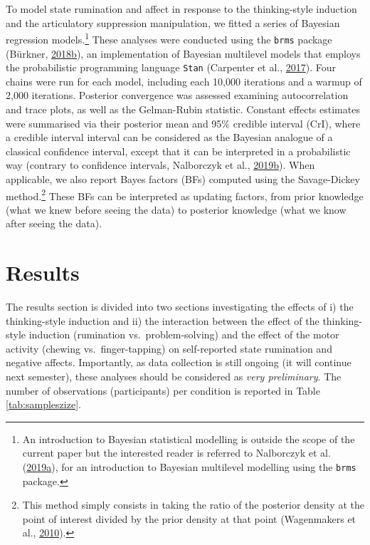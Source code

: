 \documentclass[a4paper,12pt,twoside,onecolumn,openright,final,oldfontcommands]{memoir}
\let\rmarkdownfootnote\footnote%
\def\footnote{\protect\rmarkdownfootnote}
\begin{document}
To model state rumination and affect in response to the thinking-style induction and the articulatory suppression manipulation, we fitted a series of Bayesian regression models.\footnote{An introduction to Bayesian statistical modelling is outside the scope of the current paper but the interested reader is referred to Nalborczyk et al. (\protect\hyperlink{ref-nalborczyk_introduction_2019}{2019}\protect\hyperlink{ref-nalborczyk_introduction_2019}{a}), for an introduction to Bayesian multilevel modelling using the \texttt{brms} package.} These analyses were conducted using the \texttt{brms} package (Bürkner, \protect\hyperlink{ref-R-brms}{2018}\protect\hyperlink{ref-R-brms}{b}), an implementation of Bayesian multilevel models that employs the probabilistic programming language \texttt{Stan} (Carpenter et al., \protect\hyperlink{ref-carpenter_stan_2017}{2017}). Four chains were run for each model, including each 10,000 iterations and a warmup of 2,000 iterations. Posterior convergence was assessed examining autocorrelation and trace plots, as well as the Gelman-Rubin statistic. Constant effects estimates were summarised via their posterior mean and 95\% credible interval (CrI), where a credible interval interval can be considered as the Bayesian analogue of a classical confidence interval, except that it can be interpreted in a probabilistic way (contrary to confidence intervals, Nalborczyk et al., \protect\hyperlink{ref-nalborczyk_pragmatism_2019}{2019}\protect\hyperlink{ref-nalborczyk_pragmatism_2019}{b}). When applicable, we also report Bayes factors (BFs) computed using the Savage-Dickey method.\footnote{This method simply consists in taking the ratio of the posterior density at the point of interest divided by the prior density at that point (Wagenmakers et al., \protect\hyperlink{ref-wagenmakers_bayesian_2010}{2010}).} These BFs can be interpreted as updating factors, from prior knowledge (what we knew before seeing the data) to posterior knowledge (what we know after seeing the data).

\hypertarget{results-4}{%
\section{Results}\label{results-4}}

The results section is divided into two sections investigating the effects of i) the thinking-style induction and ii) the interaction between the effect of the thinking-style induction (rumination vs.~problem-solving) and the effect of the motor activity (chewing vs.~finger-tapping) on self-reported state rumination and negative affects. Importantly, as data collection is still ongoing (it will continue next semester), these analyses should be considered as \emph{very preliminary}. The number of observations (participants) per condition is reported in Table \ref{tab:sampleszize}.
\end{document}
